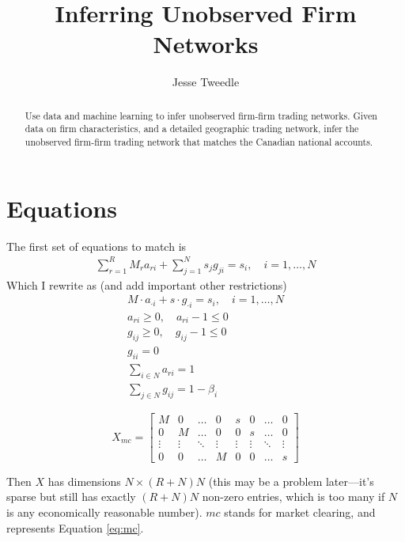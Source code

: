 \documentclass[11pt]{article}
\begin{document}
\title{Inferring Unobserved Firm Networks}
\author{Jesse Tweedle}
\date{}


 \maketitle

\begin{abstract}

Use data and machine learning to infer unobserved firm-firm trading networks. Given data on firm characteristics, and a detailed geographic trading network, infer the unobserved firm-firm trading network that matches the Canadian national accounts.

\end{abstract}

\section{Equations}

The first set of equations to match is 
\begin{gather}
\sum_{r=1}^R M_r a_{ri} + \sum_{j=1}^N s_j g_{ji} = s_i , \quad i = 1,\ldots, N
\end{gather}
Which I rewrite as (and add important other restrictions)
\begin{gather}
\label{eq:mc}
M \cdot a_{\cdot i} + s \cdot g_{\cdot i} = s_i, \quad i = 1,\ldots, N \\
a_{ri} \geq 0, \quad a_{ri} - 1 \leq 0 \\
g_{ij} \geq 0, \quad g_{ij} - 1\leq 0 \\
g_{ii} = 0 \\
\sum_{i \in N} a_{ri} = 1 \label{eq:rowsuma}\\
\sum_{j \in N} g_{ij} = 1-\beta_i\label{eq:rowsumg}
\end{gather}

\[
X_{mc} = 
\begin{bmatrix}
    M & 0 &\dots  & 0 & s & 0 & \dots & 0\\
    0 & M &\dots  & 0 & 0 & s &\dots  & 0\\
    \vdots & \vdots & \ddots & \vdots & \vdots & \vdots & \ddots & \vdots \\
    0 & 0 & \dots  & M & 0 & 0 &\dots  & s
\end{bmatrix}
\]

Then $X$ has dimensions $N \times (R+N)N$ (this may be a problem later---it's sparse but still has exactly $(R+N)N$ non-zero entries, which is too many if $N$ is any economically reasonable number). $mc$ stands for market clearing, and represents Equation \eqref{eq:mc}.
\end{document}
